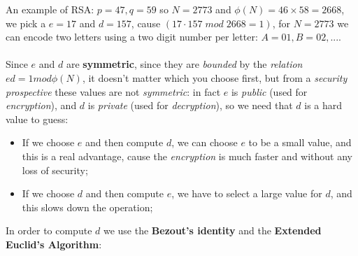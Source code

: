 \documentclass{article}
\begin{document}
An example of RSA: $p=47, q=59$ so $N=2773$ and $\phi(N) = 46 \times 58 = 2668$, we pick a $e=17$ and $d=157$, cause $(17 \cdot 157\; mod\; 2668 = 1)$, for $N=2773$ we can encode two letters using a two digit number per letter: $A=01, B=02, ...$. \\\\
Since $e$ and $d$ are \textbf{symmetric}, since they are \emph{bounded} by the \emph{relation} $ed = 1 mod \phi(N)$, it doesn't matter which you choose first, but from a \emph{security prospective} these values are not \emph{symmetric}: in fact $e$ is \emph{public} (used for \emph{encryption}), and $d$ is \emph{private} (used for \emph{decryption}), so we need that $d$ is a hard value to guess:
\begin{itemize}
\item If we choose $e$ and then compute $d$, we can choose $e$ to be a small value, and this is a real advantage, cause the \emph{encryption} is much faster and without any loss of security;
\item If we choose $d$ and then compute $e$, we have to select a large value for $d$, and this slows down the operation;
\end{itemize}
In order to compute $d$ we use the \textbf{Bezout's identity} and the \textbf{Extended Euclid's Algorithm}:
\end{document}
